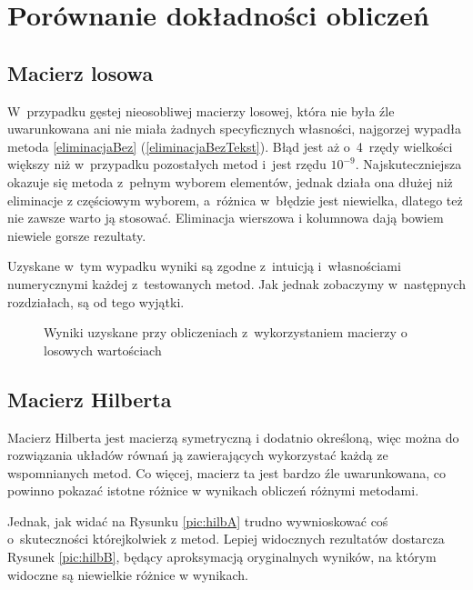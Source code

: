 \documentclass[a4paper]{article}
\begin{document}
\section{Porównanie dokładności obliczeń}

\subsection{Macierz losowa}\label{sec:random}
W~przypadku gęstej nieosobliwej macierzy losowej, która nie była źle uwarunkowana ani nie miała żadnych specyficznych własności, najgorzej wypadła metoda \ref{eliminacjaBez} (\ref{eliminacjaBezTekst}). Błąd jest aż o~4~rzędy wielkości
większy niż w~przypadku pozostałych metod i~jest rzędu $10^{-9}$. Najskuteczniejsza okazuje się metoda z~pełnym wyborem elementów, jednak działa ona dłużej niż eliminacje z częściowym wyborem, a~różnica w~błędzie
jest niewielka, dlatego też nie zawsze warto ją stosować. Eliminacja wierszowa i kolumnowa dają bowiem niewiele gorsze rezultaty.

Uzyskane w~tym wypadku wyniki są zgodne z~intuicją i~własnościami numerycznymi każdej z~testowanych metod. Jak jednak zobaczymy w~następnych rozdziałach, są od tego wyjątki.

\begin{figure}[H]
\centering
\caption{Wyniki uzyskane przy obliczeniach z~wykorzystaniem macierzy o losowych wartościach}
\label{fig:random}
\end{figure}

\subsection{Macierz Hilberta}\label{sec:hilbert}
Macierz Hilberta jest macierzą symetryczną i dodatnio określoną, więc można do rozwiązania układów równań ją zawierających wykorzystać każdą ze wspomnianych metod.
Co więcej, macierz ta jest bardzo źle uwarunkowana, co powinno pokazać istotne różnice w wynikach obliczeń różnymi metodami.

Jednak, jak widać na Rysunku \ref{pic:hilbA} trudno wywnioskować coś o~skuteczności którejkolwiek z metod. Lepiej widocznych rezultatów dostarcza Rysunek \ref{pic:hilbB},
będący aproksymacją oryginalnych wyników, na którym widoczne są niewielkie różnice w wynikach.
\end{document}
